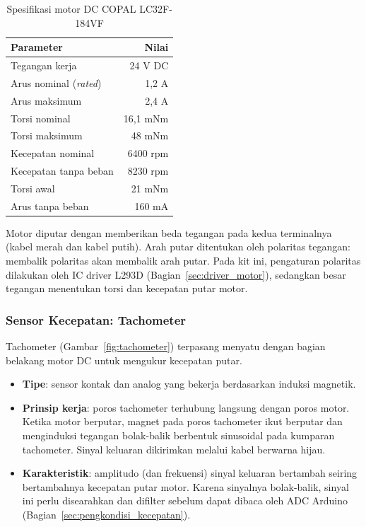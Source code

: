 \documentclass[11pt,a4paper]{article}
\begin{document}
\begin{table}[H]
	\centering
	\caption{Spesifikasi motor DC COPAL LC32F-184VF}
	\label{tab:spek_motor}
	\begin{tabular}{|l|r|}
		\hline
		\textbf{Parameter}             & \textbf{Nilai} \\
		\hline
		Tegangan kerja                 & 24 V DC        \\
		Arus nominal (\textit{rated})  & 1,2 A          \\
		Arus maksimum                  & 2,4 A          \\
		Torsi nominal                  & 16,1 mNm       \\
		Torsi maksimum                 & 48 mNm         \\
		Kecepatan nominal              & 6400 rpm       \\
		Kecepatan tanpa beban          & 8230 rpm       \\
		Torsi awal                     & 21 mNm         \\
		Arus tanpa beban               & 160 mA         \\
		\hline
	\end{tabular}
\end{table}

Motor diputar dengan memberikan beda tegangan pada kedua terminalnya (kabel merah dan kabel putih). Arah putar ditentukan oleh polaritas tegangan: membalik polaritas akan membalik arah putar. Pada kit ini, pengaturan polaritas dilakukan oleh IC driver L293D (Bagian~\ref{sec:driver_motor}), sedangkan besar tegangan menentukan torsi dan kecepatan putar motor.

\subsubsection{Sensor Kecepatan: Tachometer}
Tachometer (Gambar~\ref{fig:tachometer}) terpasang menyatu dengan bagian belakang motor DC untuk mengukur kecepatan putar.
\begin{itemize}
	\item \textbf{Tipe}: sensor kontak dan analog yang bekerja berdasarkan induksi magnetik.
	\item \textbf{Prinsip kerja}: poros tachometer terhubung langsung dengan poros motor. Ketika motor berputar, magnet pada poros tachometer ikut berputar dan menginduksi tegangan bolak-balik berbentuk sinusoidal pada kumparan tachometer. Sinyal keluaran dikirimkan melalui kabel berwarna hijau.
	\item \textbf{Karakteristik}: amplitudo (dan frekuensi) sinyal keluaran bertambah seiring bertambahnya kecepatan putar motor. Karena sinyalnya bolak-balik, sinyal ini perlu disearahkan dan difilter sebelum dapat dibaca oleh ADC Arduino (Bagian~\ref{sec:pengkondisi_kecepatan}).
\end{itemize}
\end{document}
